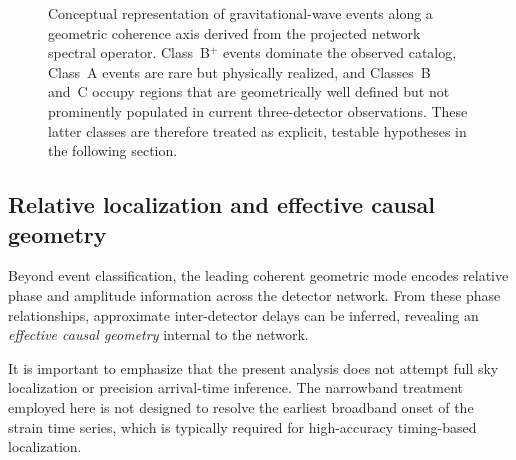 \documentclass[11pt,a4paper]{article}
\begin{document}
\begin{figure}[t]
\centering
{}
\caption{Conceptual representation of gravitational-wave events along a geometric
coherence axis derived from the projected network spectral operator.
Class~B$^+$ events dominate the observed catalog, Class~A events are rare but physically
realized, and Classes~B and~C occupy regions that are geometrically well defined but not
prominently populated in current three-detector observations.
These latter classes are therefore treated as explicit, testable hypotheses in the
following section.}
\label{fig:geometry_scale}
\end{figure}

\subsection{Relative localization and effective causal geometry}

Beyond event classification, the leading coherent geometric mode encodes relative phase
and amplitude information across the detector network.
From these phase relationships, approximate inter-detector delays can be inferred,
revealing an \emph{effective causal geometry} internal to the network.

It is important to emphasize that the present analysis does not attempt full sky localization
or precision arrival-time inference.
The narrowband treatment employed here is not designed to resolve the earliest broadband
onset of the strain time series, which is typically required for high-accuracy timing-based
localization.
\end{document}
